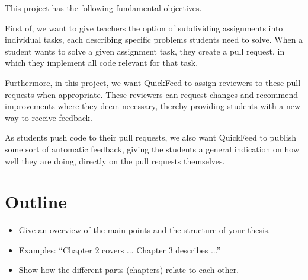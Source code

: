 This project has the following fundamental objectives.

First of, we want to give teachers the option of subdividing assignments into individual tasks, each describing specific problems students need to solve.
When a student wants to solve a given assignment task, they create a pull request, in which they implement all code relevant for that task.

Furthermore, in this project, we want QuickFeed to assign reviewers to these pull requests when appropriate.
These reviewers can request changes and recommend improvements where they deem necessary, thereby providing students with a new way to receive feedback.

As students push code to their pull requests, we also want QuickFeed to publish some sort of automatic feedback, giving the students a general indication on how well they are doing, directly on the pull requests themselves.

\section{Outline}

\begin{itemize}
\item Give an overview of the main points and the structure of your thesis.
\item Examples: ``Chapter 2 covers ...  Chapter 3 describes ...''
\item Show how the different parts (chapters) relate to each other.
\end{itemize}

